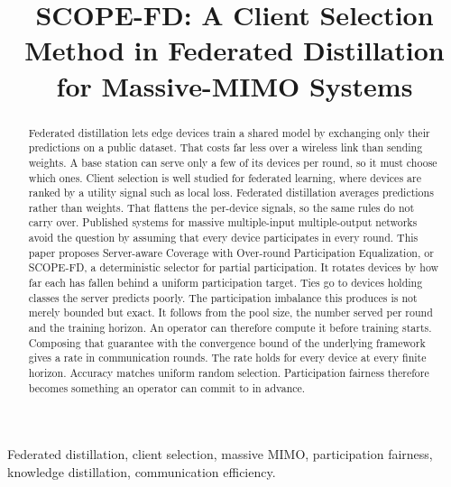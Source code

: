 \documentclass[journal]{IEEEtran}
\newcommand{\rev}[1]{#1}
\begin{document}
\title{SCOPE-FD: A Client Selection Method in Federated Distillation for Massive-MIMO Systems}

\author{
}

\maketitle

\begin{abstract}
\rev{Federated distillation lets edge devices train a shared model by exchanging only their predictions on a public dataset. That costs far less over a wireless link than sending weights. A base station can serve only a few of its devices per round, so it must choose which ones. Client selection is well studied for federated learning, where devices are ranked by a utility signal such as local loss. Federated distillation averages predictions rather than weights. That flattens the per-device signals, so the same rules do not carry over. Published systems for massive multiple-input multiple-output networks avoid the question by assuming that every device participates in every round. This paper proposes Server-aware Coverage with Over-round Participation Equalization, or SCOPE-FD, a deterministic selector for partial participation. It rotates devices by how far each has fallen behind a uniform participation target. Ties go to devices holding classes the server predicts poorly. The participation imbalance this produces is not merely bounded but exact. It follows from the pool size, the number served per round and the training horizon. An operator can therefore compute it before training starts. Composing that guarantee with the convergence bound of the underlying framework gives a rate in communication rounds. The rate holds for every device at every finite horizon. Accuracy matches uniform random selection. Participation fairness therefore becomes something an operator can commit to in advance.}
\end{abstract}

\begin{IEEEkeywords}
Federated distillation, client selection, massive MIMO, participation fairness, knowledge distillation, communication efficiency.
\end{IEEEkeywords}
\end{document}
